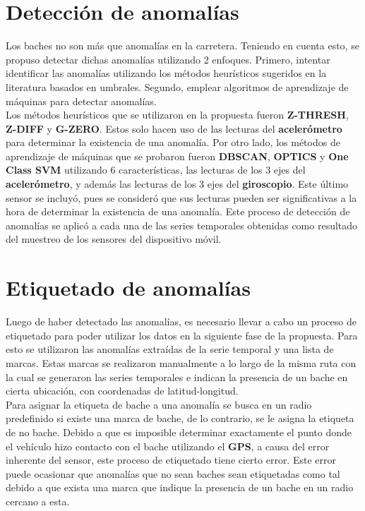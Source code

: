 \section{Detección de anomalías}
	Los baches no son más que anomalías en la carretera. Teniendo en cuenta esto, se propuso detectar dichas anomalías utilizando
	2 enfoques. Primero, intentar identificar las anomalías utilizando los métodos heurísticos sugeridos en la literatura basados
	en umbrales. Segundo, emplear algoritmos de aprendizaje de máquinas para detectar anomalías.\\
	\indent Los métodos heurísticos que se utilizaron en la propuesta fueron \textbf{Z-THRESH}, \textbf{Z-DIFF} y \textbf{G-ZERO}.
	Estos solo hacen uso de las lecturas del \textbf{acelerómetro} para determinar la existencia de una anomalía. Por otro lado, los
	métodos de aprendizaje de máquinas que se probaron fueron \textbf{DBSCAN}, \textbf{OPTICS} y \textbf{One Class SVM} utilizando 
	6 características, las lecturas de los 3 ejes del \textbf{acelerómetro}, y además las lecturas de los 3 ejes del \textbf{giroscopio}.
	Este último sensor se incluyó, pues se consideró que sus lecturas pueden ser significativas a la hora de determinar la existencia de una 
	anomalía. Este proceso de detección de anomalías se aplicó a cada una de las series temporales obtenidas como resultado del muestreo
	de los sensores del dispositivo móvil.

\section{Etiquetado de anomalías}
	Luego de haber detectado las anomalías, es necesario llevar a cabo un proceso de etiquetado para poder utilizar los datos en la siguiente
	fase de la propuesta. Para esto se utilizaron las anomalías extraídas de la serie temporal y una lista de marcas. Estas marcas se realizaron
	manualmente a lo largo de la misma ruta con la cual se generaron las series temporales e indican la presencia de un bache en cierta
	ubicación, con coordenadas de latitud-longitud.\\
	\indent Para asignar la etiqueta de bache a una anomalía se busca en un radio predefinido si existe una marca de bache, de lo contrario, se le
	asigna la etiqueta de no bache. Debido a que es imposible determinar exactamente el punto donde el vehículo hizo contacto con el bache
	utilizando el \textbf{GPS}, a causa del error inherente del sensor, este proceso de etiquetado tiene cierto error. Este error puede ocasionar
	que anomalías que no sean baches sean etiquetadas como tal debido a que exista una marca que indique la presencia de un bache en un radio
	cercano a esta.

